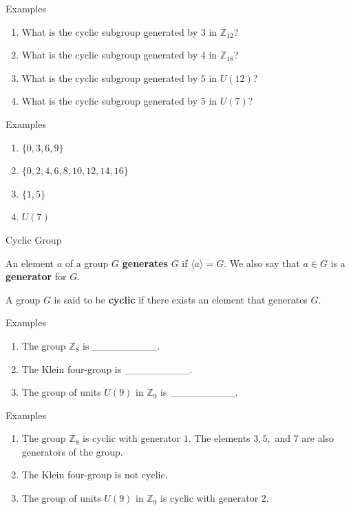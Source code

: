 \documentclass{beamer}
\begin{document}
\begin{frame}{Examples}
\begin{enumerate}
\item What is the cyclic subgroup generated by $3$ in $\mathbb{Z}_{12}$?
\item What is the cyclic subgroup generated by $4$ in $\mathbb{Z}_{18}$?
\item What is the cyclic subgroup generated by $5$ in $U(12)$?
\item What is the cyclic subgroup generated by $5$ in $U(7)$?
\end{enumerate}
\end{frame}

\begin{frame}{Examples}
\begin{enumerate}
\item $\{0, 3, 6, 9\}$ 
\pause
\item $\{0, 2, 4, 6, 8, 10, 12, 14, 16\}$
\pause
\item $\{1, 5\}$
\pause
\item $U(7)$
\end{enumerate}    
\end{frame}

\begin{frame}{Cyclic Group}
\begin{definition}
\justifying
An element $a$ of a group $G$ \textbf{generates} $G$ if $\langle a\rangle = G$. We also say that $a \in G$ is a \textbf{generator} for $G$. 
\end{definition}    
\begin{definition}
\justifying
A group $G$ is said to be \textbf{cyclic} if there exists an element that generates $G$.
\end{definition}
\end{frame}

\begin{frame}{Examples}
\begin{enumerate}
\item The group $\mathbb{Z}_8$ is \_\_\_\_\_\_\_\_\_.
\item The Klein four-group is \_\_\_\_\_\_\_\_\_.
\item The group of units $U(9)$ in $\mathbb{Z}_9$ is \_\_\_\_\_\_\_\_\_.
\end{enumerate}    
\end{frame}

\begin{frame}{Examples}
\begin{enumerate}
\item The group $\mathbb{Z}_8$ is cyclic with generator $1$. The elements $3, 5,$ and $7$ are also generators of the group.
\pause
\item The Klein four-group is not cyclic.
\pause
\item The group of units $U(9)$ in $\mathbb{Z}_9$ is cyclic with generator $2$.
\end{enumerate}    
\end{frame}
\end{document}
